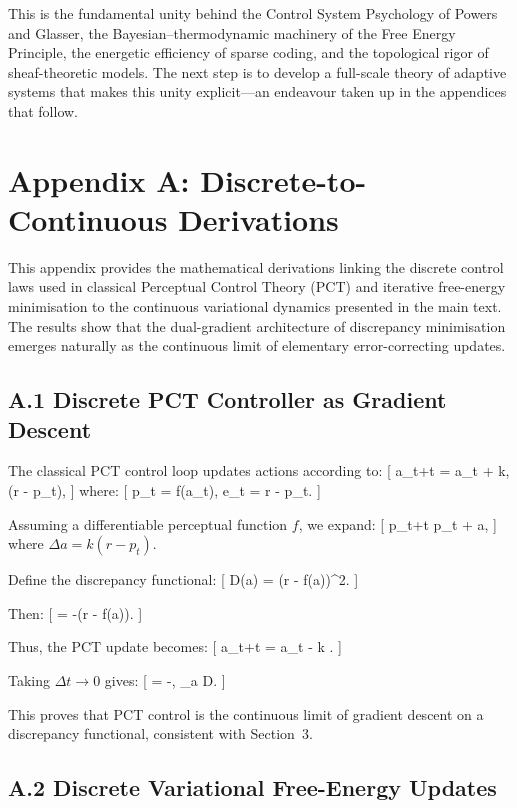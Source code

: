\documentclass[11pt,a4paper,twoside]{article}
\begin{document}
This is the fundamental unity behind the Control System Psychology of Powers and Glasser, the Bayesian--thermodynamic machinery of the Free Energy Principle, the energetic efficiency of sparse coding, and the topological rigor of sheaf-theoretic models. The next step is to develop a full-scale theory of adaptive systems that makes this unity explicit---an endeavour taken up in the appendices that follow.

\newpage
\appendix
\section*{Appendix A: Discrete-to-Continuous Derivations}

This appendix provides the mathematical derivations linking the discrete control laws used in classical Perceptual Control Theory (PCT) and iterative free-energy minimisation to the continuous variational dynamics presented in the main text. The results show that the dual-gradient architecture of discrepancy minimisation emerges naturally as the continuous limit of elementary error-correcting updates.

\subsection*{A.1 Discrete PCT Controller as Gradient Descent}

The classical PCT control loop updates actions according to:
[
a_{t+\Delta t} = a_t + k, (r - p_t),
]
where:
[
p_t = f(a_t), \qquad e_t = r - p_t.
]

Assuming a differentiable perceptual function $f$, we expand:
[
p_{t+\Delta t} \approx p_t +  \Delta a,
]
where $\Delta a = k(r - p_t)$.

Define the discrepancy functional:
[
D(a) = (r - f(a))^2.
]

Then:
[
 = -(r - f(a)).
]

Thus, the PCT update becomes:
[
a_{t+\Delta t} = a_t - k .
]

Taking $\Delta t \to 0$ gives:
[
 = -\eta, \nabla_a D.
]

This proves that PCT control is the continuous limit of gradient descent on a discrepancy functional, consistent with Section~3.

\subsection*{A.2 Discrete Variational Free-Energy Updates}
\end{document}

